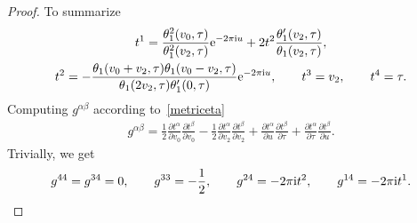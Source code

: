 \documentclass[pdftex]{sigma}%
\numberwithin{equation}{section}
\begin{document}
\begin{proof}
To summarize
\begin{gather*}
t^1=\frac{\theta_1^2(v_0,\tau)}{\theta_1^2(v_2,\tau)}{\rm e}^{-2\pi {\rm i} u}+2t^2\frac{\theta_1^{\prime}(v_2,\tau)}{\theta_1(v_2,\tau)},\nonumber
\\
t^2=-\frac{\theta_1(v_0+v_2,\tau)\theta_1(v_0-v_2,\tau)} {\theta_1(2v_2,\tau)\theta_1^{\prime}(0,\tau)}{\rm e}^{-2\pi {\rm i} u},
\qquad
t^3=v_2,
\qquad
t^4=\tau.
\end{gather*}
Computing $g^{\alpha\beta}$ according to~\eqref{metriceta}
\begin{gather*}
g^{\alpha\beta}=\frac{1}{2}\frac{\partial t^{\alpha}}{\partial v_0}\frac{\partial t^{\beta}}{\partial v_0}-\frac{1}{2}\frac{\partial t^{\alpha}}{\partial v_2}\frac{\partial t^{\beta}}{\partial v_2}+\frac{\partial t^{\alpha}}{\partial u}\frac{\partial t^{\beta}}{\partial \tau}+\frac{\partial t^{\alpha}}{\partial \tau}\frac{\partial t^{\beta}}{\partial u}.
\end{gather*}
Trivially, we get
\begin{gather*}
g^{44}=g^{34}=0,\qquad
g^{33}=-\frac{1}{2},\qquad
g^{24}=-2\pi {\rm i}t^2,\qquad
g^{14}=-2\pi {\rm i}t^1.
\end{gather*}


\end{proof}
\end{document}
